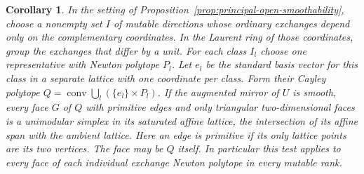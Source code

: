 \documentclass[11pt,reqno]{amsart}
\numberwithin{equation}{section}
\newtheorem{corollary}[theorem]{Corollary}
\theoremstyle{definition}
\theoremstyle{remark}
\begin{document}
\begin{corollary}\label{cor:rigid-independent-exchanges}
In the setting of Proposition~\ref{prop:principal-open-smoothability},
choose a nonempty set \(I\) of mutable directions whose ordinary
exchanges depend only on the complementary coordinates. In the Laurent
ring of those coordinates, group the exchanges that differ by a unit.
For each class \(I_l\) choose one representative with Newton polytope
\(P_l\). Let \(e_l\) be the standard basis vector for this class in a
separate lattice with one coordinate per class. Form their Cayley
polytope \(Q=\operatorname{conv}\bigcup_l(\{e_l\}\times P_l)\).
If the augmented mirror of \(U\) is smooth, every face \(G\) of \(Q\)
with primitive edges and only triangular two-dimensional faces is a
unimodular simplex in its saturated affine lattice, the intersection
of its affine span with the ambient lattice. Here an edge is primitive
if its only lattice points are its two vertices. The face may be
\(Q\) itself. In particular this test applies to every face of each
individual exchange Newton polytope in every mutable rank.
\end{corollary}
\end{document}
